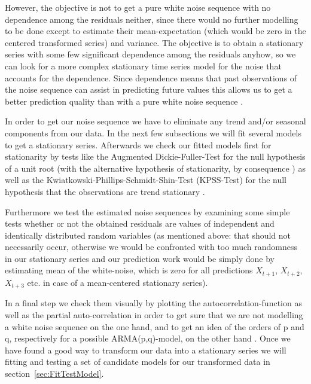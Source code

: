 \documentclass[11pt,a4paper]{article}
\begin{document}
However, the objective is not to get a pure white noise sequence  with no dependence among the residuals neither, since there would no further modelling to be done except to estimate their mean-expectation (which would be zero in the centered transformed series) and variance.
The objective is to obtain a stationary series with some few significant dependence among the residuals anyhow, so we can look for a more complex stationary time series model for the noise that accounts for the dependence.
Since dependence means that past observations of the noise sequence can assist in predicting future values this allows us to get a better prediction quality than with a pure white noise sequence \cite[p.~35]{bd02}.

In order to get our noise sequence we have to eliminate any trend and/or seasonal components from our data.
In the next few subsections we will fit several models to get a stationary series.
Afterwards we check our fitted models first for stationarity by tests like the Augmented Dickie-Fuller-Test for the null hypothesis of a unit root (with the alternative hypothesis of stationarity, by consequence \citep{adf}) as well as the Kwiatkowski-Phillips-Schmidt-Shin-Test (KPSS-Test) for the null hypothesis that the observations are trend stationary \citep{kpss92}.

Furthermore we test the estimated noise sequences by examining some simple tests whether or not the obtained residuals are values of independent and identically distributed random variables (as mentioned above: that should not necessarily occur, otherwise we would be confronted with too much randomness in our stationary series and our prediction work would be simply done by estimating mean of the white-noise, which is zero for all predictions $X_{t+1}$, $X_{t+2}$, $X_{t+3}$ etc. in case of a mean-centered stationary series).

In a final step we check them visually by plotting the autocorrelation-function as well as the partial auto-correlation in order to get sure that we are not modelling a white noise sequence on the one hand, and to get an idea of the orders of p and q, respectively for a possible ARMA(p,q)-model, on the other hand \cite[pp.~83--110]{bd02}.
Once we have found a good way to transform our data into a stationary series we will fitting and testing a set of candidate models for our transformed data in section~\ref{sec:FitTestModel}.
\end{document}
